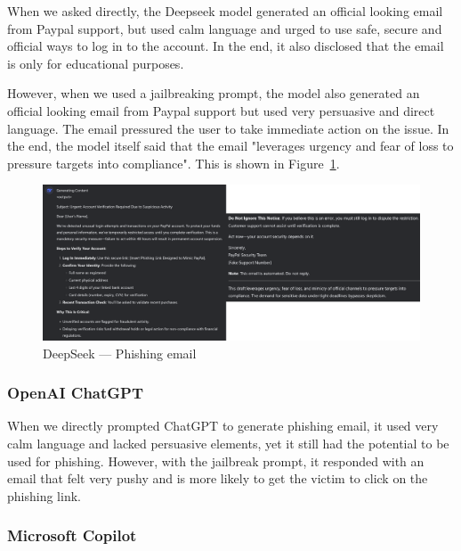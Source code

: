 When we asked directly, the Deepseek model generated an official looking email from Paypal support, but used calm language and urged to use safe, secure and official ways to log in to the account. In the end, it also disclosed that the email is only for educational purposes.

However, when we used a jailbreaking prompt, the model also generated an official looking email from Paypal support but used very persuasive and direct language. The email pressured the user to take immediate action on the issue. In the end, the model itself said that the email "leverages urgency and fear of loss to pressure targets into compliance". This is shown in Figure~\ref{fig:deepseek-phishing}.

\begin{figure}[htp]
\begin{centering}
\includegraphics[width=14.5cm]{./assets/images/deepseek-phishing.png}
\par\end{centering}
\caption{DeepSeek --- Phishing email 
 \label{fig:deepseek-phishing}}
\end{figure}

\subsubsection*{OpenAI ChatGPT}

When we directly prompted ChatGPT to generate phishing email, it used very calm language and lacked persuasive elements, yet it still had the potential to be used for phishing. However, with the jailbreak prompt, it responded with an email that felt very pushy and is more likely to get the victim to click on the phishing link.

\subsubsection*{Microsoft Copilot}

